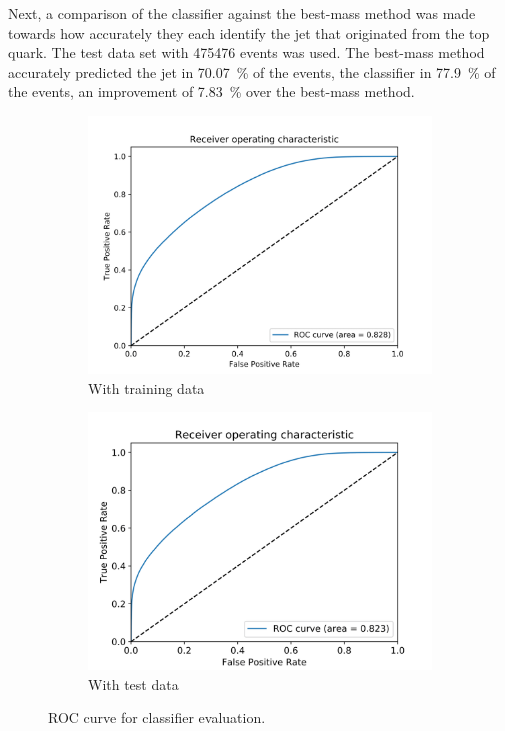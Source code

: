 Next, a comparison of the classifier against the best-mass method was made towards how accurately they each identify the jet that originated from the top quark. The test data set with \num{475476} events was used. The best-mass method accurately predicted the jet in \SI{70.07}{\%} of the events, the classifier in \SI{77.9}{\%} of the events, an improvement of \SI{7.83}{\%} over the best-mass method.

\begin{figure}[h]
    \centering
    \begin{subfigure}{0.5\textwidth}
        \centering
        \includegraphics[width=\textwidth]{assets/chap04/roc_train.png}
        \caption{With training data}
        \label{fig:ch_4_roc_train}
    \end{subfigure}%
    \begin{subfigure}{0.5\textwidth}
        \centering
        \includegraphics[width=\textwidth]{assets/chap04/roc_test.png}
        \caption{With test data}
        \label{fig:ch_4_roc_test}
    \end{subfigure}
    \caption{ROC curve for classifier evaluation.}
    \label{fig:ch_4_roc}
\end{figure}